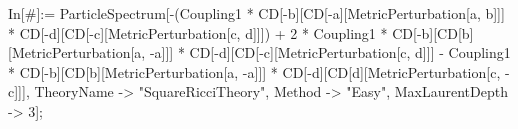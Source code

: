 In[\#]:= ParticleSpectrum[-(Coupling1 * CD[-b][CD[-a][MetricPerturbation[a, b]]] * CD[-d][CD[-c][MetricPerturbation[c, d]]]) + 2 * Coupling1 * CD[-b][CD[b][MetricPerturbation[a, -a]]] * CD[-d][CD[-c][MetricPerturbation[c, d]]] - Coupling1 * CD[-b][CD[b][MetricPerturbation[a, -a]]] * CD[-d][CD[d][MetricPerturbation[c, -c]]], TheoryName -> "SquareRicciTheory", Method -> "Easy", MaxLaurentDepth -> 3]; 